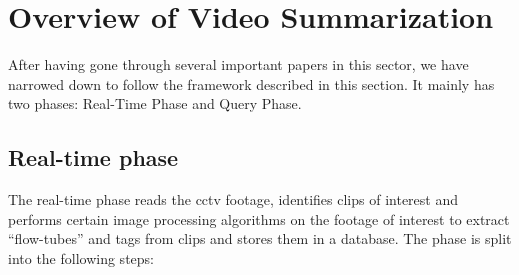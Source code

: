 \chapter{Overview of Video Summarization}

After having gone through several important papers in this sector, we have narrowed down to follow the framework described in this section. It mainly has two phases: Real-Time Phase and Query Phase.


\section{Real-time phase}
The real-time phase reads the cctv footage, identifies clips of interest and performs certain image processing algorithms on the footage of interest to extract “flow-tubes” and tags from clips and stores them in a database. The phase is split into the following steps:

